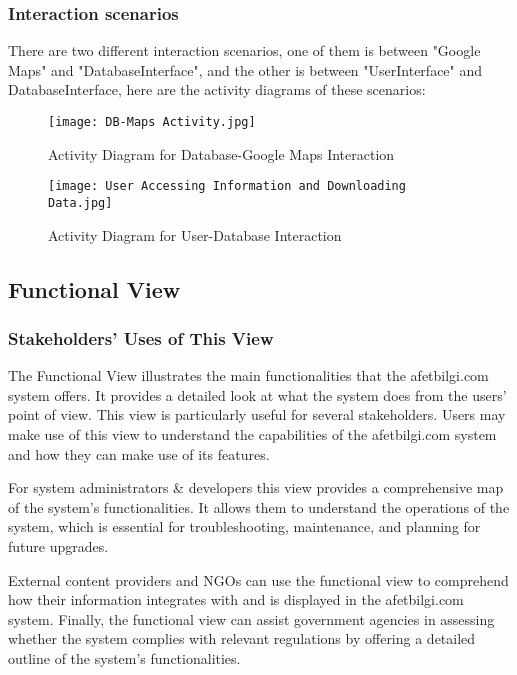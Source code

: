 \documentclass[12pt, letterpaper]{article}
\begin{document}
\newpage

\subsubsection{Interaction scenarios}
There are two different interaction scenarios, one of them is between "Google Maps" and "DatabaseInterface", and the other is between "UserInterface" and DatabaseInterface, here are the activity diagrams of these scenarios:

\begin{figure}[H] %
\centering
\texttt{[image: DB-Maps Activity.jpg]}
\caption{Activity Diagram for Database-Google Maps Interaction}
\end{figure}

\newpage

\begin{figure}[H]
\centering
\texttt{[image: User Accessing Information and Downloading Data.jpg]}
\caption{Activity Diagram for User-Database Interaction}
\end{figure}

\newpage

\subsection{Functional View}
\subsubsection{Stakeholders' Uses of This View}
The Functional View illustrates the main functionalities that the afetbilgi.com system offers. It provides a detailed look at what the system does from the users' point of view. This view is particularly useful for several stakeholders. Users may make use of this view to understand the capabilities of the afetbilgi.com system and how they can make use of its features. 

For system administrators \& developers this view provides a comprehensive map of the system's functionalities. It allows them to understand the operations of the system, which is essential for troubleshooting, maintenance, and planning for future upgrades.

External content providers and NGOs can use the functional view to comprehend how their information integrates with and is displayed in the afetbilgi.com system. Finally, the functional view can assist government agencies in assessing whether the system complies with relevant regulations by offering a detailed outline of the system's functionalities.
\end{document}
